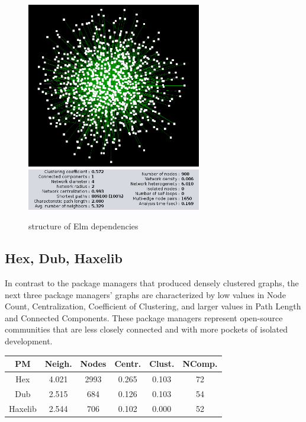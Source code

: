 \documentclass[letterpaper, 10 pt, conference]{ieeeconf}  %
\begin{document}
\begin{figure} %
\centering
\includegraphics[width=3in]{images/Elm_Graph.png}
\includegraphics[width=3in]{images/Elm_Params_Screenshot.png}
\caption{\label{Elm_Graph} structure of Elm dependencies}
\end{figure}


\subsection{Hex, Dub, Haxelib}

In contrast to the package managers that produced densely clustered graphs,
the next three package managers' graphs are characterized 
by low values in Node Count, Centralization, Coefficient of Clustering,
and larger values in Path Length and Connected Components. 
These package managers represent open-source communities 
that are less closely connected and with more pockets of isolated development.

\begin{center}
\begin{tabular}{||c c c c c c ||} 
\hline
PM & Neigh. & Nodes & Centr. & Clust. & NComp. \\ [0.5ex] 
\hline\hline
Hex & 4.021 &	2993 &	0.265 &	0.103 & 72 \\ 
\hline
Dub & 2.515 &	684	& 0.126 &	0.103 &	54 \\
\hline
Haxelib & 2.544 & 706 & 0.102 & 0.000	& 52  \\ [1ex] 
\hline
\end{tabular}
\end{center}
\end{document}
